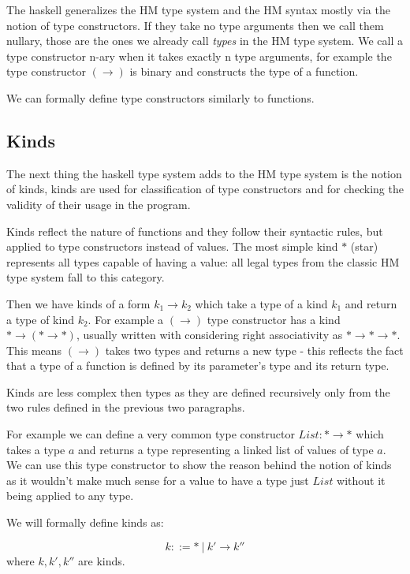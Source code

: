 The haskell generalizes the HM type system and the HM syntax mostly via the notion of type constructors. If they take no type arguments then we call them nullary, those are the ones we already call \emph{types} in the HM type system. We call a type constructor n-ary when it takes exactly n type arguments, for example the type constructor $(\rightarrow)$ is binary and constructs the type of a function. %

We can formally define type constructors similarly to functions.

\subsection{Kinds}

The next thing the haskell type system adds to the HM type system is the notion of kinds, kinds are used for classification of type constructors and for checking the validity of their usage in the program.

Kinds reflect the nature of functions and they follow their syntactic rules, but applied to type constructors instead of values. The most simple kind $*$ (star) represents all types capable of having a value: all legal types from the classic HM type system fall to this category.

Then we have kinds of a form $k_1 \rightarrow k_2$ which take a type of a kind $k_1$ and return a type of kind $k_2$. For example a $(\rightarrow)$ type constructor has a kind $* \rightarrow (* \rightarrow *)$, usually written with considering right associativity as $* \rightarrow * \rightarrow *$. This means $(\rightarrow)$ takes two types and returns a new type - this reflects the fact that a type of a function is defined by its parameter's type and its return type.

Kinds are less complex then types as they are defined recursively only from the two rules defined in the previous two paragraphs.

For example we can define a very common type constructor $List: * \rightarrow *$ which takes a type $a$ and returns a type representing a linked list of values of type $a$. We can use this type constructor to show the reason behind the notion of kinds as it wouldn't make much sense for a value to have a type just $List$ without it being applied to any type. %

We will formally define kinds as:

\begin{defn}[kinds]
    $$k ::= *\ |\ k' \rightarrow k''$$
    where $k, k', k''$ are kinds.
\end{defn}

